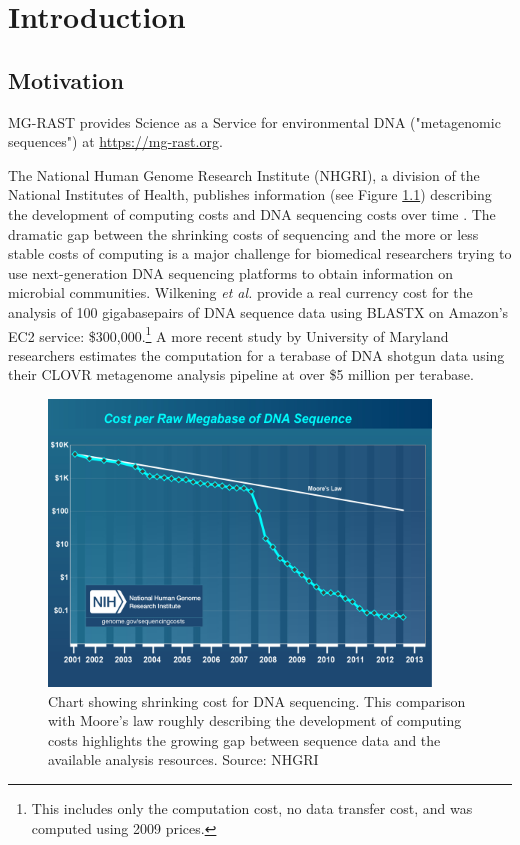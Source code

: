 \documentclass[12pt,fullpage]{report}
\begin{document}
\chapter{Introduction}
\setcounter{page}{1}
\section{Motivation}

MG-RAST provides Science as a Service for environmental DNA ("metagenomic sequences") at \url{https://mg-rast.org}.%


The National Human Genome Research Institute (NHGRI), a division of the National Institutes of Health, publishes information (see Figure \ref{fig:cost_per_megabase}) describing the development of computing costs and DNA sequencing costs over time \cite{NHGRI_COST}. The dramatic gap between the shrinking costs of sequencing and the more or less stable costs of computing is a major challenge for biomedical researchers trying to use next-generation DNA sequencing platforms to obtain information on microbial communities. Wilkening \textit{et al.} \cite{MGCLOUD} provide a real currency cost for the analysis of 100 gigabasepairs of DNA sequence data using BLASTX on Amazon's \gls{EC2} service: \$300,000.\footnote{This includes only the computation cost, no data transfer cost, and was computed using 2009 prices.} A more recent study by University of Maryland researchers \cite{CLOVR} estimates the computation for a terabase of DNA shotgun data using their CLOVR metagenome analysis pipeline at over \$5 million per terabase.

\begin{figure}
\begin{center}
 \includegraphics[width=4in]{Images/cost_per_megabase.png}
\end{center}
\label{fig:cost_per_megabase}
\caption{Chart showing shrinking cost for DNA sequencing. This comparison with Moore's law roughly describing the development of computing costs highlights the growing gap between sequence data and the available analysis resources. Source: NHGRI \cite{NHGRI_COST}
}
\end{figure}
\end{document}
